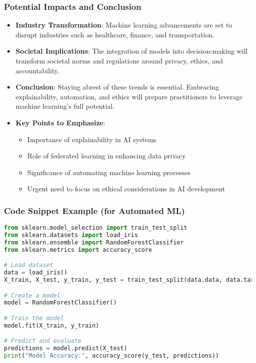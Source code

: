 \documentclass[aspectratio=169]{beamer}
\begin{document}
\begin{frame}[fragile]
    \frametitle{Potential Impacts and Conclusion}
    \begin{itemize}
        \item \textbf{Industry Transformation}: Machine learning advancements are set to disrupt industries such as healthcare, finance, and transportation.
        
        \item \textbf{Societal Implications}: The integration of models into decision-making will transform societal norms and regulations around privacy, ethics, and accountability.
        
        \item \textbf{Conclusion}: Staying abrest of these trends is essential. Embracing explainability, automation, and ethics will prepare practitioners to leverage machine learning's full potential.
        
        \item \textbf{Key Points to Emphasize}:
        \begin{itemize}
            \item Importance of explainability in AI systems
            \item Role of federated learning in enhancing data privacy
            \item Significance of automating machine learning processes
            \item Urgent need to focus on ethical considerations in AI development
        \end{itemize}
    \end{itemize}
\end{frame}

\begin{frame}
    \frametitle{Code Snippet Example (for Automated ML)}
    \begin{lstlisting}[language=Python]
from sklearn.model_selection import train_test_split
from sklearn.datasets import load_iris
from sklearn.ensemble import RandomForestClassifier
from sklearn.metrics import accuracy_score

# Load dataset
data = load_iris()
X_train, X_test, y_train, y_test = train_test_split(data.data, data.target, test_size=0.3, random_state=42)

# Create a model
model = RandomForestClassifier()

# Train the model
model.fit(X_train, y_train)

# Predict and evaluate
predictions = model.predict(X_test)
print("Model Accuracy:", accuracy_score(y_test, predictions))
    \end{lstlisting}
\end{frame}
\end{document}
